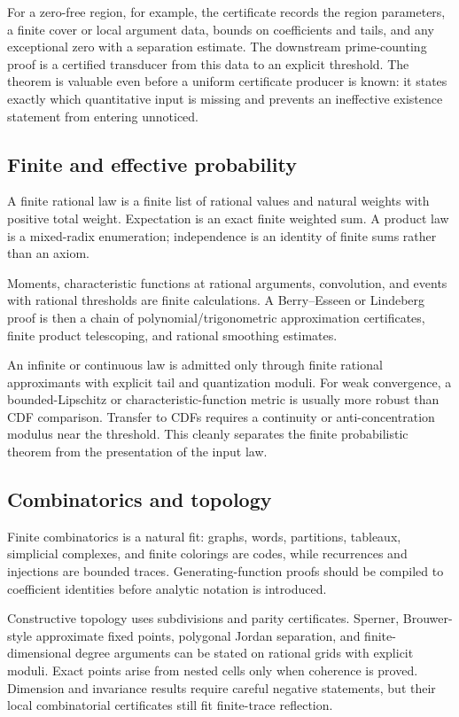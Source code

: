 For a zero-free region, for example, the certificate records the region
parameters, a finite cover or local argument data, bounds on coefficients and
tails, and any exceptional zero with a separation estimate.  The downstream
prime-counting proof is a certified transducer from this data to an explicit
threshold.  The theorem is valuable even before a uniform certificate producer
is known: it states exactly which quantitative input is missing and prevents
an ineffective existence statement from entering unnoticed.

\subsection{Finite and effective probability}

A finite rational law is a finite list of rational values and natural weights
with positive total weight.  Expectation is an exact finite weighted sum.  A
product law is a mixed-radix enumeration; independence is an identity of
finite sums rather than an axiom.

Moments, characteristic functions at rational arguments, convolution, and
events with rational thresholds are finite calculations.  A Berry--Esseen or
Lindeberg proof is then a chain of polynomial/trigonometric approximation
certificates, finite product telescoping, and rational smoothing estimates.

An infinite or continuous law is admitted only through finite rational
approximants with explicit tail and quantization moduli.  For weak convergence,
a bounded-Lipschitz or characteristic-function metric is usually more robust
than CDF comparison.  Transfer to CDFs requires a continuity or
anti-concentration modulus near the threshold.  This cleanly separates the
finite probabilistic theorem from the presentation of the input law.

\subsection{Combinatorics and topology}

Finite combinatorics is a natural fit: graphs, words, partitions, tableaux,
simplicial complexes, and finite colorings are codes, while recurrences and
injections are bounded traces.  Generating-function proofs should be compiled
to coefficient identities before analytic notation is introduced.

Constructive topology uses subdivisions and parity certificates.  Sperner,
Brouwer-style approximate fixed points, polygonal Jordan separation, and
finite-dimensional degree arguments can be stated on rational grids with
explicit moduli.  Exact points arise from nested cells only when coherence is
proved.  Dimension and invariance results require careful negative statements,
but their local combinatorial certificates still fit finite-trace reflection.
